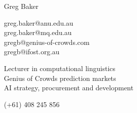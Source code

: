 \documentclass{article}[11pt]
\begin{document}
\pagestyle{empty}
\begin{minipage}{\textwidth}
  \begin{center}
    {\LARGE Greg Baker}
    
    \vspace{5mm}
    
    
    \vspace{5mm}

    greg.baker@anu.edu.au \\
    greg.baker@mq.edu.au \\
    gregb@genius-of-crowds.com \\
    gregb@ifost.org.au 
    
    \vspace{5mm}
    {\small
      Lecturer in computational linguistics \\
      Genius of Crowds prediction markets \\
      AI strategy, procurement and development
    }
    
    \vspace{5mm}
    
    (+61) 408 245 856
\end{center}
        \end{minipage}
\end{document}
